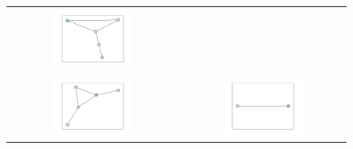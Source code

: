 \documentclass[12pt, a4paper]{extarticle}
\begin{document}
\begin{figure}
\begin{tabularx}{\textwidth}{cc}
\includegraphics[width=0.5\textwidth]{task11-graphlets/5_10-14-21-25-23.pdf} \\
\includegraphics[width=0.5\textwidth]{task11-graphlets/5_14-21-18-25-23.pdf} &
\includegraphics[width=0.5\textwidth]{task11-graphlets/2_21-23.pdf} \\
\end{tabularx}\end{figure}
\end{document}
